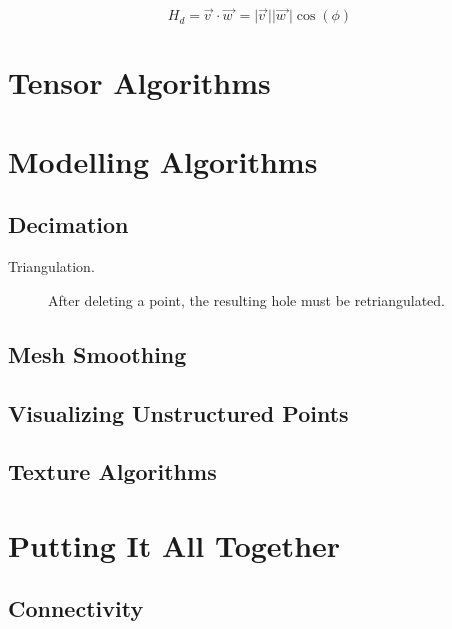 \begin{equation}\label{eq:9.12}
H_d = \overrightarrow{v\ } \cdot \overrightarrow{w\ } = \vert \overrightarrow{v\ } \vert \vert \overrightarrow{w\ } \vert \cos(\phi)
\end{equation}

\section{Tensor Algorithms}

\section{Modelling Algorithms}

\subsection{Decimation}

\begin{description}
	\item[Triangulation.] \label{subsec:decimation.triangulation} After deleting a point, the resulting hole must be retriangulated.
\end{description}

\subsection{Mesh Smoothing}
\label{subsec:mesh_smoothing}

\subsection{Visualizing Unstructured Points}
\label{subsec:visualizing_unstructured_points}

\subsection{Texture Algorithms}
\label{subsec:texture_algorithms}

\section{Putting It All Together}

\subsection{Connectivity}
\label{subsec:connectivity}

